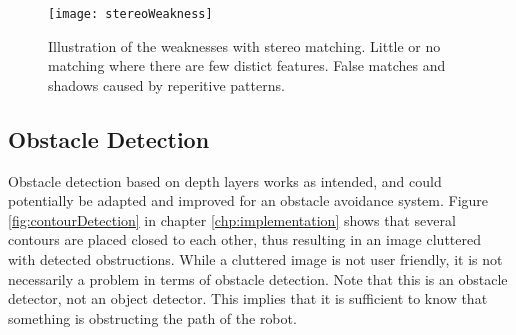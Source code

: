\begin{figure}
	\texttt{[image: stereoWeakness]}
	\caption{Illustration of the weaknesses with stereo matching. Little or no matching where there are few distict features. False matches and shadows caused by reperitive patterns.}
	\label{fig:stereoWeakness}
\end{figure}

\subsection{Obstacle Detection}



Obstacle detection based on depth layers works as intended, and could potentially be adapted and improved for an obstacle avoidance system. Figure \ref{fig:contourDetection} in chapter \ref{chp:implementation} shows that several contours are placed closed to each other, thus resulting in an image cluttered with detected obstructions. While a cluttered image is not user friendly, it is not necessarily a problem in terms of obstacle detection. Note that this is an obstacle detector, not an object detector. This implies that it is sufficient to know that something is obstructing the path of the robot. 


